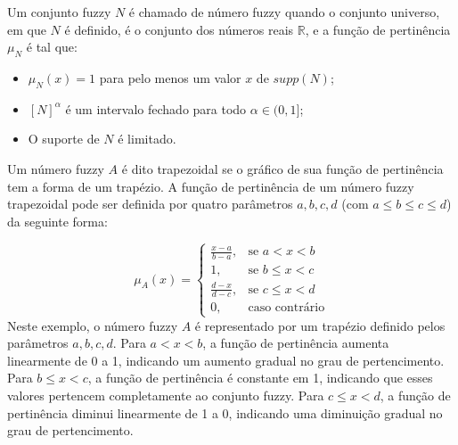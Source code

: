 \begin{definicao}
Um conjunto fuzzy $N$ é chamado de número fuzzy quando o conjunto universo, em que $N$ é definido, é o conjunto dos números reais $\mathbb{R}$, e a função de pertinência $\mu_N$ é tal que:
\begin{itemize}
    \item $\mu_N(x) = 1$ para pelo menos um valor $x$ de $supp(N)$;
    \item $[N]^{\alpha}$ é um intervalo fechado para todo $\alpha \in (0,1]$;
    \item O suporte de $N$ é limitado.
\end{itemize}
\end{definicao}

\begin{exemplo}
    Um número fuzzy $A$ é dito trapezoidal se o gráfico de sua função de pertinência tem a forma de um trapézio. A função de pertinência de um número fuzzy trapezoidal pode ser definida por quatro parâmetros $a, b, c, d$ (com $a \leq b \leq c \leq d$) da seguinte forma:
\end{exemplo}
$$\mu_A(x) = \begin{cases}
\frac{x - a}{b - a}, & \text{se } a < x < b \\
1, & \text{se } b \leq x < c \\
\frac{d - x}{d - c}, & \text{se } c \leq x < d \\
0, & \text{caso contrário} 
\end{cases}$$
Neste exemplo, o número fuzzy $A$ é representado por um trapézio definido pelos parâmetros $a, b, c, d$. Para $a < x < b$, a função de pertinência aumenta linearmente de 0 a 1, indicando um aumento gradual no grau de pertencimento. Para $b \leq x < c$, a função de pertinência é constante em 1, indicando que esses valores pertencem completamente ao conjunto fuzzy. Para $c \leq x < d$, a função de pertinência diminui linearmente de 1 a 0, indicando uma diminuição gradual no grau de pertencimento.

